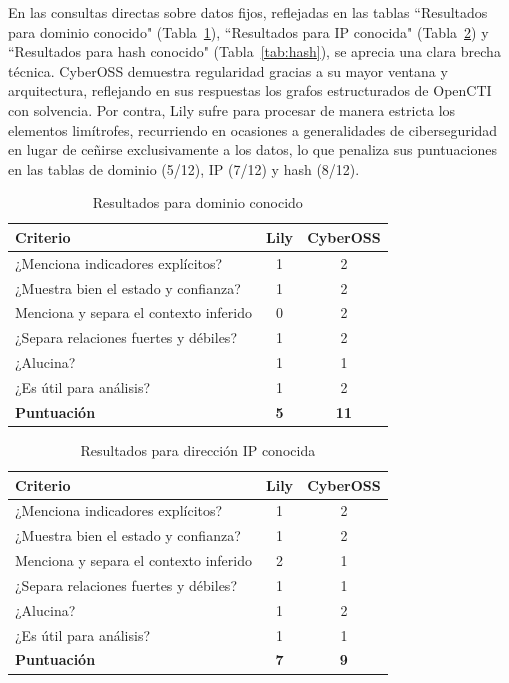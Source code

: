\documentclass[12pt]{report}
\begin{document}
En las consultas directas sobre datos fijos, reflejadas en las tablas ``Resultados para dominio conocido" (Tabla~\ref{tab:dominio}), ``Resultados para IP conocida" (Tabla~\ref{tab:ip}) y ``Resultados para hash conocido" (Tabla~\ref{tab:hash}), se aprecia una clara brecha técnica. CyberOSS demuestra regularidad gracias a su mayor ventana y arquitectura, reflejando en sus respuestas los grafos estructurados de OpenCTI con solvencia. Por contra, Lily sufre para procesar de manera estricta los elementos limítrofes, recurriendo en ocasiones a generalidades de ciberseguridad en lugar de ceñirse exclusivamente a los datos, lo que penaliza sus puntuaciones en las tablas de dominio (5/12), IP (7/12) y hash (8/12).

\begin{table}[H]
	\centering
	\small
	\begin{tabular}{ l c c }
		\toprule
		\textbf{Criterio} & \textbf{Lily} & \textbf{CyberOSS}  \\
		\midrule
		¿Menciona indicadores explícitos? & 1 & 2 \\
		¿Muestra bien el estado y confianza? & 1 & 2 \\
		Menciona y separa el contexto inferido & 0 & 2 \\
		¿Separa relaciones fuertes y débiles?  & 1 & 2 \\
		¿Alucina? & 1 & 1 \\
		¿Es útil para análisis? & 1 & 2 \\
		\midrule
		\textbf{Puntuación} & \textbf{5} & \textbf{11} \\
		\bottomrule
	\end{tabular}
	\caption{Resultados para dominio conocido}
	\label{tab:dominio}
\end{table}

\begin{table}[H]
	\centering
	\small
	\begin{tabular}{ l c c }
		\toprule
		\textbf{Criterio} & \textbf{Lily} & \textbf{CyberOSS}  \\
		\midrule
		¿Menciona indicadores explícitos? & 1 & 2 \\
		¿Muestra bien el estado y confianza? & 1 & 2 \\
		Menciona y separa el contexto inferido & 2 & 1\\
		¿Separa relaciones fuertes y débiles?  & 1 & 1\\
		¿Alucina? & 1 & 2 \\
		¿Es útil para análisis? & 1 & 1 \\
		\midrule
		\textbf{Puntuación} & \textbf{7} & \textbf{9} \\
		\bottomrule
	\end{tabular}
	\caption{Resultados para dirección IP conocida}
	\label{tab:ip}
\end{table}
\end{document}
